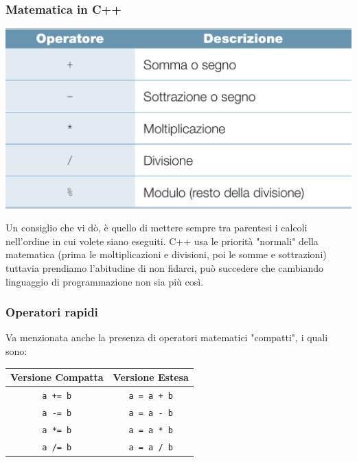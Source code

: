 \documentclass{beamer}
\begin{document}
    \begin{frame}
        \frametitle{Matematica in C++}
        \begin{center}
            \includegraphics[scale=0.17]{img/operators.png}
        \end{center}
        Un consiglio che vi dò, è quello di mettere sempre tra parentesi i calcoli nell'ordine in cui volete siano eseguiti. C++ usa le priorità "normali" della matematica (prima le moltiplicazioni e divisioni, poi le somme e sottrazioni) tuttavia prendiamo l'abitudine di non fidarci, può succedere che cambiando linguaggio di programmazione non sia più così.
    \end{frame}

    \begin{frame}[fragile]
        \frametitle{Operatori rapidi}
        Va menzionata anche la presenza di operatori matematici "compatti", i quali sono:
        \begin{table}
            \begin{tabular}{c | c}
                Versione Compatta & Versione Estesa \\
                \hline
                \texttt{a += b} & \texttt{a = a + b} \\
                \texttt{a -= b} & \texttt{a = a - b} \\
                \texttt{a *= b} & \texttt{a = a * b} \\
                \texttt{a /= b} & \texttt{a = a / b} \\
            \end{tabular}
        \end{table}
    \end{frame}
\end{document}
